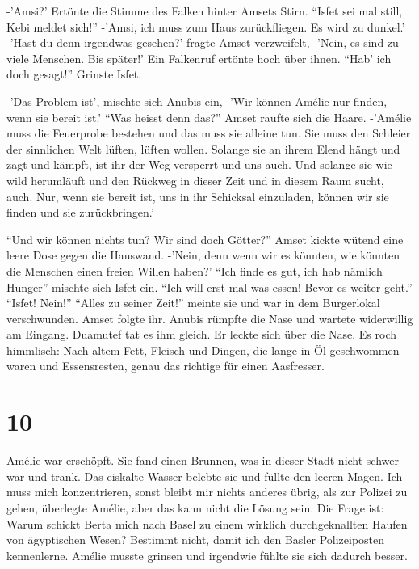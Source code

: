\documentclass[11pt,titlepage,a5paper]{book}
\begin{document}
-'Amsi?' Ertönte die Stimme des Falken hinter Amsets Stirn. "`Isfet sei mal still, Kebi meldet sich!"' -'Amsi, ich muss zum Haus zurückfliegen. Es wird zu dunkel.' -'Hast du denn irgendwas gesehen?' fragte Amset verzweifelt, -'Nein, es sind zu viele Menschen. Bis später!' Ein Falkenruf ertönte hoch über ihnen. "`Hab' ich doch gesagt!"' Grinste Isfet.

-'Das Problem ist', mischte sich Anubis ein, -'Wir können Amélie nur finden, wenn sie bereit ist.' "`Was heisst denn das?"' Amset raufte sich die Haare. -'Amélie muss die Feuerprobe bestehen und das muss sie alleine tun. Sie muss den Schleier der sinnlichen Welt lüften, lüften wollen. Solange sie an ihrem Elend hängt und zagt und kämpft, ist ihr der Weg versperrt und uns auch. Und solange sie wie wild herumläuft und den Rückweg in dieser Zeit und in diesem Raum sucht, auch. Nur, wenn sie bereit ist, uns in ihr Schicksal einzuladen, können wir sie finden und sie zurückbringen.'

"`Und wir können nichts tun? Wir sind doch Götter?"' Amset kickte wütend eine leere Dose gegen die Hauswand. -'Nein, denn wenn wir es könnten, wie könnten die Menschen einen freien Willen haben?' "`Ich finde es gut, ich hab nämlich Hunger"' mischte sich Isfet ein. "`Ich will erst mal was essen! Bevor es weiter geht."' "`Isfet! Nein!"' "`Alles zu seiner Zeit!"' meinte sie und war in dem Burgerlokal verschwunden. Amset folgte ihr. Anubis rümpfte die Nase und wartete widerwillig am Eingang. Duamutef tat es ihm gleich. Er leckte sich über die Nase. Es roch himmlisch: Nach altem Fett, Fleisch und Dingen, die lange in Öl geschwommen waren und Essensresten, genau das richtige für einen Aasfresser.

\section*{10}

Amélie war erschöpft. Sie fand einen Brunnen, was in dieser Stadt nicht schwer war und trank. Das eiskalte Wasser belebte sie und füllte den leeren Magen. Ich muss mich konzentrieren, sonst bleibt mir nichts anderes übrig, als zur Polizei zu gehen, überlegte Amélie, aber das kann nicht die Lösung sein. Die Frage ist: Warum schickt Berta mich nach Basel zu einem wirklich durchgeknallten Haufen von ägyptischen Wesen? Bestimmt nicht, damit ich den Basler Polizeiposten kennenlerne. Amélie musste grinsen und irgendwie fühlte sie sich dadurch besser. 
\end{document}
